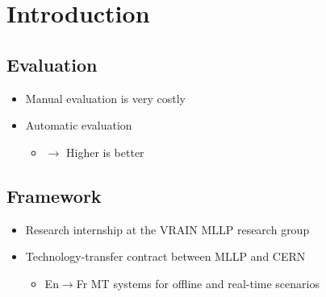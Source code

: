 \documentclass[landscape]{article}
\begin{document}

\cp
\section*{Introduction}
\vspace*{10mm}
\subsection*{Evaluation}
\vspace*{5mm}
\begin{itemize} \itemsep=5mm
	\item Manual evaluation is very costly
	\item Automatic evaluation
	\begin{itemize}
		\item {} $\to$ Higher is better
	\end{itemize}
\end{itemize}
\vspace*{-5mm}

\subsection*{Framework}
\vspace*{5mm}
\begin{itemize}\itemsep=5mm
	\item Research internship at the VRAIN MLLP research group
	\item Technology-transfer contract between MLLP and CERN
	\begin{itemize}
		\item En$\to$Fr MT systems for offline and real-time scenarios
	\end{itemize}
\end{itemize}

\end{document}
